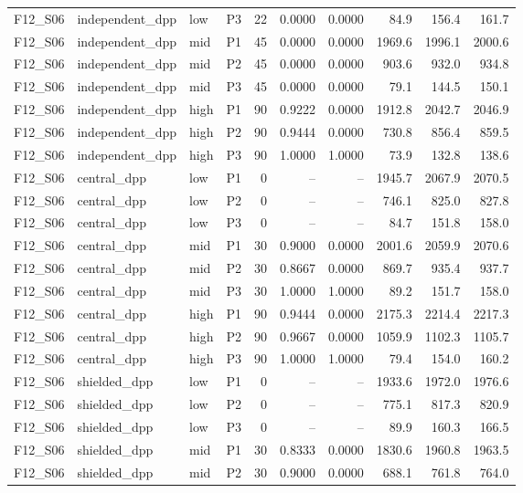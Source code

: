 \begin{longtable}{llllrrrrrr}
F12\_S06 & independent\_dpp & low & P3 & 22 & 0.0000 & 0.0000 & 84.9 & 156.4 & 161.7 \\
F12\_S06 & independent\_dpp & mid & P1 & 45 & 0.0000 & 0.0000 & 1969.6 & 1996.1 & 2000.6 \\
F12\_S06 & independent\_dpp & mid & P2 & 45 & 0.0000 & 0.0000 & 903.6 & 932.0 & 934.8 \\
F12\_S06 & independent\_dpp & mid & P3 & 45 & 0.0000 & 0.0000 & 79.1 & 144.5 & 150.1 \\
F12\_S06 & independent\_dpp & high & P1 & 90 & 0.9222 & 0.0000 & 1912.8 & 2042.7 & 2046.9 \\
F12\_S06 & independent\_dpp & high & P2 & 90 & 0.9444 & 0.0000 & 730.8 & 856.4 & 859.5 \\
F12\_S06 & independent\_dpp & high & P3 & 90 & 1.0000 & 1.0000 & 73.9 & 132.8 & 138.6 \\
F12\_S06 & central\_dpp & low & P1 & 0 & -- & -- & 1945.7 & 2067.9 & 2070.5 \\
F12\_S06 & central\_dpp & low & P2 & 0 & -- & -- & 746.1 & 825.0 & 827.8 \\
F12\_S06 & central\_dpp & low & P3 & 0 & -- & -- & 84.7 & 151.8 & 158.0 \\
F12\_S06 & central\_dpp & mid & P1 & 30 & 0.9000 & 0.0000 & 2001.6 & 2059.9 & 2070.6 \\
F12\_S06 & central\_dpp & mid & P2 & 30 & 0.8667 & 0.0000 & 869.7 & 935.4 & 937.7 \\
F12\_S06 & central\_dpp & mid & P3 & 30 & 1.0000 & 1.0000 & 89.2 & 151.7 & 158.0 \\
F12\_S06 & central\_dpp & high & P1 & 90 & 0.9444 & 0.0000 & 2175.3 & 2214.4 & 2217.3 \\
F12\_S06 & central\_dpp & high & P2 & 90 & 0.9667 & 0.0000 & 1059.9 & 1102.3 & 1105.7 \\
F12\_S06 & central\_dpp & high & P3 & 90 & 1.0000 & 1.0000 & 79.4 & 154.0 & 160.2 \\
F12\_S06 & shielded\_dpp & low & P1 & 0 & -- & -- & 1933.6 & 1972.0 & 1976.6 \\
F12\_S06 & shielded\_dpp & low & P2 & 0 & -- & -- & 775.1 & 817.3 & 820.9 \\
F12\_S06 & shielded\_dpp & low & P3 & 0 & -- & -- & 89.9 & 160.3 & 166.5 \\
F12\_S06 & shielded\_dpp & mid & P1 & 30 & 0.8333 & 0.0000 & 1830.6 & 1960.8 & 1963.5 \\
F12\_S06 & shielded\_dpp & mid & P2 & 30 & 0.9000 & 0.0000 & 688.1 & 761.8 & 764.0 \\

\end{longtable}
